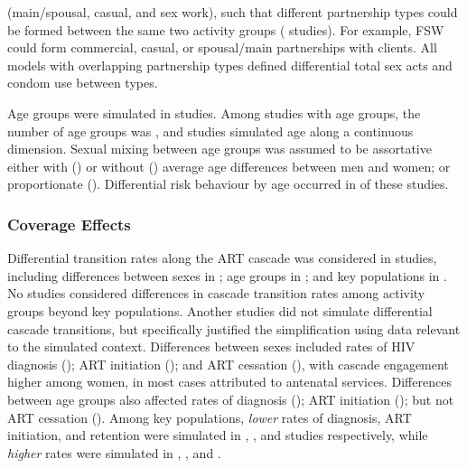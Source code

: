 (main/spousal, casual, and sex work), such that
different partnership types could be formed between the same two activity groups ( studies).
For example, FSW could form commercial, casual, or spousal/main partnerships with clients.
All models with overlapping partnership types defined differential total sex acts and condom use between types.
\par
Age groups were simulated in  studies.
Among studies with age groups, the number of age groups was ,
and  studies simulated age along a continuous dimension.
Sexual mixing between age groups was assumed to be assortative
either with () or without ()
average age differences between men and women;
or proportionate ().
Differential risk behaviour by age occurred in  of these  studies.
\subsubsection{Coverage Effects}
\label{sss:res:cov}
Differential transition rates along the ART cascade was considered in
 studies, including differences between
sexes in ;
age groups in ; and
key populations in .
No studies considered differences in cascade transition rates
among activity groups beyond key populations. %
Another  studies did not simulate differential cascade transitions,
but specifically justified the simplification using data relevant to the simulated context.
Differences between sexes included rates of
HIV diagnosis ();
ART initiation (); and
ART cessation (),
with cascade engagement higher among women,
in most cases attributed to antenatal services.
Differences between age groups also affected
rates of diagnosis ();
ART initiation ();
but not ART cessation (). %
Among key populations, \emph{lower} rates of
diagnosis, ART initiation, and retention were simulated in
, , and 
studies respectively, while \emph{higher} rates were simulated in
, , and .
